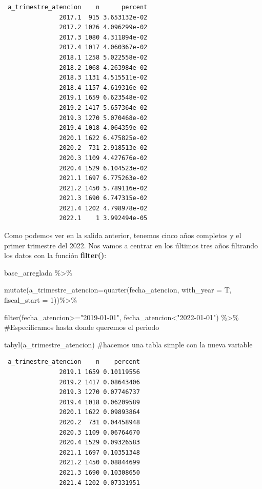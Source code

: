 \documentclass[
  letterpaper,
  DIV=11,
  numbers=noendperiod]{scrreprt}
\newenvironment{Shaded}{\begin{snugshade}}{\end{snugshade}}
\newcommand{\AttributeTok}[1]{\textcolor[rgb]{0.40,0.45,0.13}{#1}}
\newcommand{\CommentTok}[1]{\textcolor[rgb]{0.37,0.37,0.37}{#1}}
\newcommand{\DecValTok}[1]{\textcolor[rgb]{0.68,0.00,0.00}{#1}}
\newcommand{\FunctionTok}[1]{\textcolor[rgb]{0.28,0.35,0.67}{#1}}
\newcommand{\NormalTok}[1]{\textcolor[rgb]{0.00,0.23,0.31}{#1}}
\newcommand{\SpecialCharTok}[1]{\textcolor[rgb]{0.37,0.37,0.37}{#1}}
\newcommand{\StringTok}[1]{\textcolor[rgb]{0.13,0.47,0.30}{#1}}
\begin{document}
\begin{verbatim}
 a_trimestre_atencion    n      percent
               2017.1  915 3.653132e-02
               2017.2 1026 4.096299e-02
               2017.3 1080 4.311894e-02
               2017.4 1017 4.060367e-02
               2018.1 1258 5.022558e-02
               2018.2 1068 4.263984e-02
               2018.3 1131 4.515511e-02
               2018.4 1157 4.619316e-02
               2019.1 1659 6.623548e-02
               2019.2 1417 5.657364e-02
               2019.3 1270 5.070468e-02
               2019.4 1018 4.064359e-02
               2020.1 1622 6.475825e-02
               2020.2  731 2.918513e-02
               2020.3 1109 4.427676e-02
               2020.4 1529 6.104523e-02
               2021.1 1697 6.775263e-02
               2021.2 1450 5.789116e-02
               2021.3 1690 6.747315e-02
               2021.4 1202 4.798978e-02
               2022.1    1 3.992494e-05
\end{verbatim}

Como podemos ver en la salida anterior, tenemos cinco años completos y
el primer trimestre del 2022. Nos vamos a centrar en los últimos tres
años filtrando los datos con la función \textbf{filter()}:

\begin{Shaded}
\begin{Highlighting}[]
\NormalTok{base\_arreglada }\SpecialCharTok{\%\textgreater{}\%} 
  
  \FunctionTok{mutate}\NormalTok{(}\AttributeTok{a\_trimestre\_atencion=}\FunctionTok{quarter}\NormalTok{(fecha\_atencion, }\AttributeTok{with\_year =}\NormalTok{ T, }\AttributeTok{fiscal\_start =} \DecValTok{1}\NormalTok{))}\SpecialCharTok{\%\textgreater{}\%} 
 
   \FunctionTok{filter}\NormalTok{(fecha\_atencion}\SpecialCharTok{\textgreater{}=}\StringTok{"2019{-}01{-}01"}\NormalTok{, fecha\_atencion}\SpecialCharTok{\textless{}}\StringTok{"2022{-}01{-}01"}\NormalTok{) }\SpecialCharTok{\%\textgreater{}\%}  \CommentTok{\#Especificamos hasta donde queremos el periodo }
  
   \FunctionTok{tabyl}\NormalTok{(a\_trimestre\_atencion) }\CommentTok{\#hacemos una tabla simple con la nueva variable}
\end{Highlighting}
\end{Shaded}

\begin{verbatim}
 a_trimestre_atencion    n    percent
               2019.1 1659 0.10119556
               2019.2 1417 0.08643406
               2019.3 1270 0.07746737
               2019.4 1018 0.06209589
               2020.1 1622 0.09893864
               2020.2  731 0.04458948
               2020.3 1109 0.06764670
               2020.4 1529 0.09326583
               2021.1 1697 0.10351348
               2021.2 1450 0.08844699
               2021.3 1690 0.10308650
               2021.4 1202 0.07331951
\end{verbatim}
\end{document}
